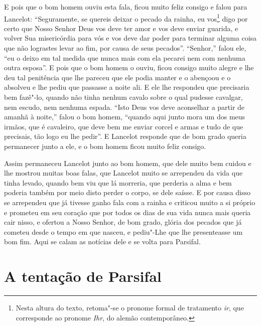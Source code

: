 E pois que o bom homem ouviu esta fala, ficou muito feliz consigo e falou para
Lancelot: “Seguramente, se quereis deixar o pecado da rainha, eu vos\footnote{
Nesta altura do texto, retoma"-se o pronome formal de tratamento \textit{ir},
que corresponde ao pronome \textit{Ihr}, do alemão contemporâneo.
 } digo por certo que Nosso Senhor Deus vos deve ter amor e vos deve enviar
guarida, e volver Sua misericórdia para vós e vos deve dar poder para terminar
alguma coisa que não lograstes levar ao fim, por causa de seus pecados”. 
“Senhor,” falou ele, “eu o deixo em tal medida que nunca mais com ela
pecarei nem com nenhuma outra esposa”. E pois que o bom homem o ouviu, ficou
consigo muito alegre e lhe deu tal penitência que lhe pareceu que ele podia
manter e o abençoou e o absolveu e lhe pediu que passasse a noite ali. E ele
lhe respondeu que precisaria bem fazê"-lo, quando não tinha nenhum cavalo sobre
o qual pudesse cavalgar, nem escudo, nem nenhuma espada. “Isto Deus vos deve
aconselhar a partir de amanhã à noite,” falou o bom homem, “quando aqui junto
mora um dos meus irmãos, que é cavaleiro, que deve bem me enviar corcel e armas
e tudo de que precisais, tão logo eu lhe pedir”. E Lancelot responde
que de bom grado queria permanecer junto a ele, e o bom homem ficou muito feliz
consigo.

Assim permaneceu Lancelot junto ao bom homem, que dele muito bem cuidou e lhe
mostrou muitas boas falas, que Lancelot muito se arrependeu da vida que tinha
levado, quando bem viu que lá morreria, que perderia a alma e bem poderia
também por meio disto perder o corpo, se dele saísse. E por causa disso se
arrependeu que já tivesse ganho fala com a rainha e criticou muito a si próprio
e prometeu em seu coração que por todos os dias de sua vida nunca mais queria
cair nisso, e ofertou a Nosso Senhor, de bom grado, glória dos pecados que já
cometeu desde o tempo em que nasceu, e pediu"-Lhe que lhe presenteasse um bom
fim. Aqui se calam as notícias dele e se volta para Parsifal. 

\chapter{A tentação de Parsifal}

